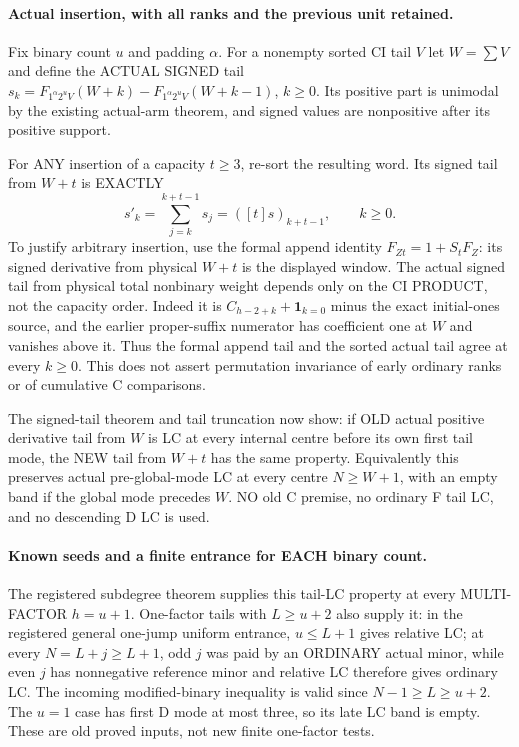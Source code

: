 \paragraph{Actual insertion, with all ranks and the previous unit retained.}
Fix binary count $u$ and padding $\alpha$. For a nonempty sorted
CI tail $V$ let $W=\sum V$ and define the ACTUAL SIGNED tail
$s_k=F_{1^\alpha2^uV}(W+k)-F_{1^\alpha2^uV}(W+k-1)$,
$k\ge0$. Its positive part is unimodal by the existing actual-arm
theorem, and signed values are nonpositive after its positive support.

For ANY insertion of a capacity $t\ge3$, re-sort the resulting word.
Its signed tail from $W+t$ is EXACTLY
\[
             s'_k=\sum_{j=k}^{k+t-1}s_j
                         =([t]s)_{k+t-1},\qquad k\ge0. \tag{1}
\]
To justify arbitrary insertion, use the formal append identity
$F_{Zt}=1+S_tF_Z$: its signed derivative from physical $W+t$ is
the displayed window. The actual signed tail from physical total
nonbinary weight depends only on the CI PRODUCT, not the capacity
order. Indeed it is $C_{h-2+k}+\mathbf1_{k=0}$ minus the exact
initial-ones source, and the earlier proper-suffix numerator has
coefficient one at $W$ and vanishes above it. Thus the formal append
tail and the sorted actual tail agree at every $k\ge0$.
This does not assert permutation invariance of early ordinary ranks
or of cumulative C comparisons.

The signed-tail theorem and tail truncation now show:
if OLD actual positive derivative tail from $W$ is LC at every
internal centre before its own first tail mode, the NEW tail from
$W+t$ has the same property. Equivalently this preserves actual
pre-global-mode LC at every centre $N\ge W+1$, with an empty
band if the global mode precedes $W$. NO old C premise, no ordinary
F tail LC, and no descending D LC is used.

\paragraph{Known seeds and a finite entrance for EACH binary count.}
The registered subdegree theorem supplies this tail-LC property at
every MULTI-FACTOR $h=u+1$. One-factor tails with $L\ge u+2$ also
supply it: in the registered general one-jump uniform entrance,
$u\le L+1$ gives relative LC; at every $N=L+j\ge L+1$, odd $j$
was paid by an ORDINARY actual minor, while even $j$ has nonnegative
reference minor and relative LC therefore gives ordinary LC.
The incoming modified-binary inequality is valid since
$N-1\ge L\ge u+2$. The $u=1$ case has first D mode at most
three, so its late LC band is empty. These are old proved inputs,
not new finite one-factor tests.

